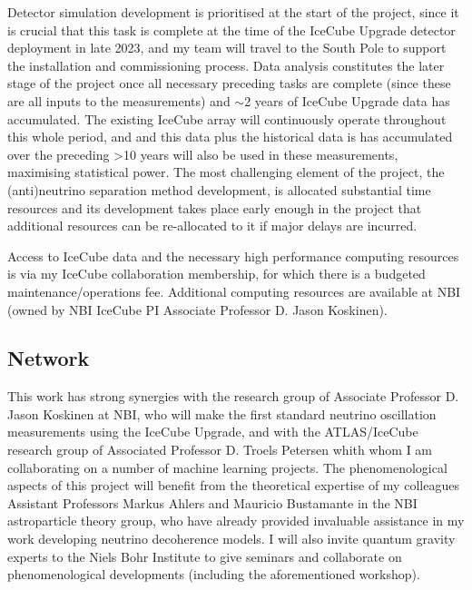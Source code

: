 \documentclass[a4paper,11pt]{article}
\begin{document}
Detector simulation development is prioritised at the start of the project, since it is crucial that this task is complete at the time of the IceCube Upgrade detector deployment in late 2023, and my team will travel to the South Pole to support the installation and commissioning process. Data analysis constitutes the later stage of the project once all necessary preceding tasks are complete (since these are all inputs to the measurements) and $\sim$2 years of IceCube Upgrade data has accumulated. The existing IceCube array will continuously operate throughout this whole period, and and this data plus the historical data is has accumulated over the preceding >10 years will also be used in these measurements, maximising statistical power. The most challenging element of the project, the (anti)neutrino separation method development, is allocated substantial time resources and its development takes place early enough in the project that additional resources can be re-allocated to it if major delays are incurred.

Access to IceCube data and the necessary high performance computing resources is via my IceCube collaboration membership, for which there is a budgeted maintenance/operations fee. Additional computing resources are available at NBI (owned by NBI IceCube PI Associate Professor D. Jason Koskinen).




\subsection{Network}

This work has strong synergies with the research group of Associate Professor D. Jason Koskinen at NBI, who will make the first standard neutrino oscillation measurements using the IceCube Upgrade, and with the ATLAS/IceCube research group of Associated Professor D. Troels Petersen whith whom I am collaborating on a number of machine learning projects. The phenomenological aspects of this project will benefit from the theoretical expertise of my colleagues Assistant Professors Markus Ahlers and Mauricio Bustamante in the NBI astroparticle theory group, who have already provided invaluable assistance in my work developing neutrino decoherence models. I will also invite quantum gravity experts to the Niels Bohr Institute to give seminars and collaborate on phenomenological developments (including the aforementioned workshop).
\end{document}

